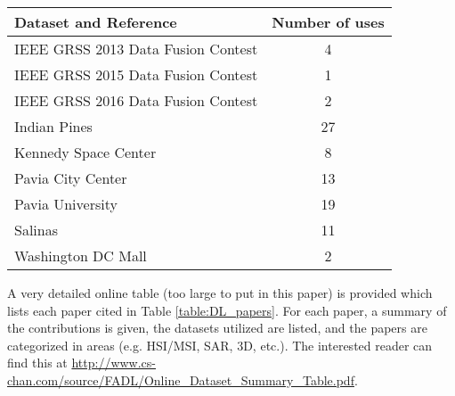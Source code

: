 \documentclass[12pt]{spieman}
\begin{document}
\begin{spacing}{1}
\begin{table}[ht]
\begin{center}
\begin{tabular}{|l|c|}
\hline
\rule[-1ex]{0pt}{3.5ex}  \textbf{Dataset and Reference}         &  \textbf{Number of uses} \\
\hline
\hline

IEEE GRSS 2013 Data Fusion Contest \cite{IEEEGRSSDataFusion2013Dataset}     & 4   \\
\hline

IEEE GRSS 2015 Data Fusion Contest \cite{IEEEGRSSDataFusion2015Dataset}     & 1   \\
\hline

IEEE GRSS 2016 Data Fusion Contest \cite{IEEEGRSSDataFusion2016Dataset}     & 2   \\
\hline

Indian Pines \cite{IndianPinesDataset}	                                    & 27  \\
\hline

Kennedy Space Center \cite{KennedySpaceCenterDataSet}                       & 8   \\
\hline

Pavia City Center \cite{PaviaDatasets}                                      & 13  \\
\hline

Pavia University \cite{PaviaDatasets}                                       & 19  \\
\hline

Salinas \cite{SalinasDataset}                                               & 11  \\
\hline

Washington DC Mall \cite{WashingtonDCMallDataset}                            & 2   \\
\hline

\end{tabular}
\end{center}
\end{table}

A very detailed online table (too large to put in this paper) is provided which lists each paper cited in Table \ref{table:DL_papers}. For each paper, a summary of the contributions is given, the datasets utilized are listed, and the papers are categorized in areas (e.g. HSI/MSI, SAR, 3D, etc.). The interested reader can find this at \url{http://www.cs-chan.com/source/FADL/Online_Dataset_Summary_Table.pdf}.


\end{spacing}
\end{document}
